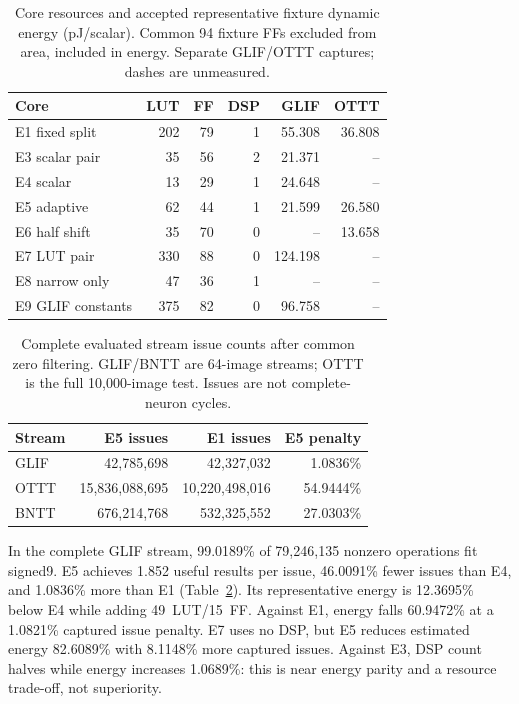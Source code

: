 \documentclass[conference]{IEEEtran}
\begin{document}
\begin{table}[t]
\centering\footnotesize
\caption{Core resources and accepted representative fixture dynamic energy (pJ/scalar). Common 94 fixture FFs excluded from area, included in energy. Separate GLIF/OTTT captures; dashes are unmeasured.}
\begin{tabular}{@{}lrrrrr@{}}
\toprule
Core&LUT&FF&DSP&GLIF&OTTT\\\midrule
E1 fixed split&202&79&1&55.308&36.808\\
E3 scalar pair&35&56&2&21.371&--\\
E4 scalar&13&29&1&24.648&--\\
E5 adaptive&62&44&1&21.599&26.580\\
E6 half shift&35&70&0&--&13.658\\
E7 LUT pair&330&88&0&124.198&--\\
E8 narrow only&47&36&1&--&--\\
E9 GLIF constants&375&82&0&96.758&--\\\bottomrule
\end{tabular}
\label{tab:results}
\end{table}

\begin{table}[t]
\centering\footnotesize
\caption{Complete evaluated stream issue counts after common zero filtering. GLIF/BNTT are 64-image streams; OTTT is the full 10,000-image test. Issues are not complete-neuron cycles.}
\begin{tabular}{@{}lrrr@{}}
\toprule
Stream&E5 issues&E1 issues&E5 penalty\\\midrule
GLIF&42,785,698&42,327,032&1.0836\%\\
OTTT&15,836,088,695&10,220,498,016&54.9444\%\\
BNTT&676,214,768&532,325,552&27.0303\%\\\bottomrule
\end{tabular}
\label{tab:issues}
\end{table}

In the complete GLIF stream, 99.0189\% of 79,246,135 nonzero operations fit signed9. E5 achieves 1.852 useful results per issue, 46.0091\% fewer issues than E4, and 1.0836\% more than E1 (Table~\ref{tab:issues}). Its representative energy is 12.3695\% below E4 while adding 49~LUT/15~FF. Against E1, energy falls 60.9472\% at a 1.0821\% captured issue penalty. E7 uses no DSP, but E5 reduces estimated energy 82.6089\% with 8.1148\% more captured issues. Against E3, DSP count halves while energy increases 1.0689\%: this is near energy parity and a resource trade-off, not superiority.
\end{document}
